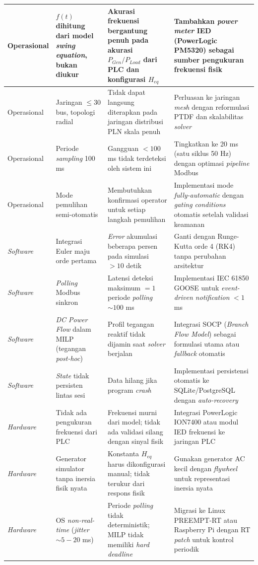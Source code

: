 \begin{longtable}{|p{2cm}|p{3.5cm}|p{3.5cm}|p{4.5cm}|}
Operasional & $f(t)$ dihitung dari model \textit{swing equation}, bukan diukur & Akurasi frekuensi bergantung penuh pada akurasi $P_{Gen}/P_{Load}$ dari PLC dan konfigurasi $H_{eq}$ & Tambahkan \textit{power meter} IED (PowerLogic PM5320) sebagai sumber pengukuran frekuensi fisik \\ \hline
Operasional & Jaringan $\le 30$ bus, topologi radial & Tidak dapat langsung diterapkan pada jaringan distribusi PLN skala penuh & Perluasan ke jaringan \textit{mesh} dengan reformulasi PTDF dan skalabilitas \textit{solver} \\ \hline
Operasional & Periode \textit{sampling} 100 ms & Gangguan $< 100$ ms tidak terdeteksi oleh sistem ini & Tingkatkan ke 20 ms (satu siklus 50 Hz) dengan optimasi \textit{pipeline} Modbus \\ \hline
Operasional & Mode pemulihan semi-otomatis & Membutuhkan konfirmasi operator untuk setiap langkah pemulihan & Implementasi mode \textit{fully-automatic} dengan \textit{gating conditions} otomatis setelah validasi keamanan \\ \hline
\textit{Software} & Integrasi Euler maju orde pertama & \textit{Error} akumulasi beberapa persen pada simulasi $>10$ detik & Ganti dengan Runge-Kutta orde 4 (RK4) tanpa perubahan arsitektur \\ \hline
\textit{Software} & \textit{Polling} Modbus sinkron & Latensi deteksi maksimum $= 1$ periode \textit{polling} $\sim 100$ ms & Implementasi IEC 61850 GOOSE untuk \textit{event-driven notification} $<1$ ms \\ \hline
\textit{Software} & \textit{DC Power Flow} dalam MILP (tegangan \textit{post-hoc}) & Profil tegangan reaktif tidak dijamin saat \textit{solver} berjalan & Integrasi SOCP (\textit{Branch Flow Model}) sebagai formulasi utama atau \textit{fallback} otomatis \\ \hline
\textit{Software} & \textit{State} tidak persisten lintas sesi & Data hilang jika program \textit{crash} & Implementasi persistensi otomatis ke SQLite/PostgreSQL dengan \textit{auto-recovery} \\ \hline
\textit{Hardware} & Tidak ada pengukuran frekuensi dari PLC & Frekuensi murni dari model; tidak ada validasi silang dengan sinyal fisik & Integrasi PowerLogic ION7400 atau modul IED frekuensi ke jaringan PLC \\ \hline
\textit{Hardware} & Generator simulator tanpa inersia fisik nyata & Konstanta $H_{eq}$ harus dikonfigurasi manual; tidak terukur dari respons fisik & Gunakan generator AC kecil dengan \textit{flywheel} untuk representasi inersia nyata \\ \hline
\textit{Hardware} & OS \textit{non-real-time} (\textit{jitter} $\sim 5-20$ ms) & Periode \textit{polling} tidak deterministik; MILP tidak memiliki \textit{hard deadline} & Migrasi ke Linux PREEMPT-RT atau Raspberry Pi dengan RT \textit{patch} untuk kontrol periodik \\
\end{longtable}